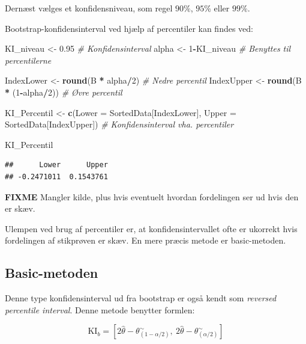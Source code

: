 \documentclass[
]{book}
\newenvironment{Shaded}{\begin{snugshade}}{\end{snugshade}}
\newcommand{\CommentTok}[1]{\textcolor[rgb]{0.56,0.35,0.01}{\textit{#1}}}
\newcommand{\DataTypeTok}[1]{\textcolor[rgb]{0.13,0.29,0.53}{#1}}
\newcommand{\DecValTok}[1]{\textcolor[rgb]{0.00,0.00,0.81}{#1}}
\newcommand{\FloatTok}[1]{\textcolor[rgb]{0.00,0.00,0.81}{#1}}
\newcommand{\KeywordTok}[1]{\textcolor[rgb]{0.13,0.29,0.53}{\textbf{#1}}}
\newcommand{\NormalTok}[1]{#1}
\newcommand{\OperatorTok}[1]{\textcolor[rgb]{0.81,0.36,0.00}{\textbf{#1}}}
\newcommand{\StringTok}[1]{\textcolor[rgb]{0.31,0.60,0.02}{#1}}
\theoremstyle{definition}
\theoremstyle{definition}
\theoremstyle{definition}
\theoremstyle{remark}
\begin{document}
Dernæst vælges et konfidensniveau, som regel \(90\%\), \(95\%\) eller \(99\%\).

Bootstrap-konfidensinterval ved hjælp af percentiler kan findes ved:

\begin{Shaded}
\begin{Highlighting}[]
\NormalTok{KI_niveau <-}\StringTok{ }\FloatTok{0.95} \CommentTok{# Konfidensinterval}
\NormalTok{alpha <-}\StringTok{ }\DecValTok{1}\OperatorTok{-}\NormalTok{KI_niveau }\CommentTok{# Benyttes til percentilerne}

\NormalTok{IndexLower <-}\StringTok{ }\KeywordTok{round}\NormalTok{(B }\OperatorTok{*}\StringTok{ }\NormalTok{alpha}\OperatorTok{/}\DecValTok{2}\NormalTok{) }\CommentTok{# Nedre percentil}
\NormalTok{IndexUpper <-}\StringTok{ }\KeywordTok{round}\NormalTok{(B }\OperatorTok{*}\StringTok{ }\NormalTok{(}\DecValTok{1}\OperatorTok{-}\NormalTok{alpha}\OperatorTok{/}\DecValTok{2}\NormalTok{)) }\CommentTok{# Øvre percentil}

\NormalTok{KI_Percentil <-}\StringTok{ }\KeywordTok{c}\NormalTok{(}\DataTypeTok{Lower =}\NormalTok{ SortedData[IndexLower], }\DataTypeTok{Upper =}\NormalTok{ SortedData[IndexUpper])}
  \CommentTok{# Konfidensinterval vha. percentiler}

\NormalTok{KI_Percentil}
\end{Highlighting}
\end{Shaded}

\begin{verbatim}
##      Lower      Upper 
## -0.2471011  0.1543761
\end{verbatim}

\textbf{FIXME} Mangler kilde, plus hvis eventuelt hvordan fordelingen ser ud hvis den er skæv.

Ulempen ved brug af percentiler er, at konfidensintervallet ofte er ukorrekt hvis fordelingen af stikprøven er skæv. En mere præcis metode er basic-metoden.

\hypertarget{basic-metoden}{%
\subsection{Basic-metoden}\label{basic-metoden}}

Denne type konfidensinterval ud fra bootstrap er også kendt som \emph{reversed percentile interval}. Denne metode benytter formlen:

\[\text{KI}_b = \left[2\hat\theta- \theta^{{\sim}}_{(1-\alpha/2)}, ~ 2\hat\theta- \theta^{{\sim}}_{(\alpha/2)}\right]\]
\end{document}
